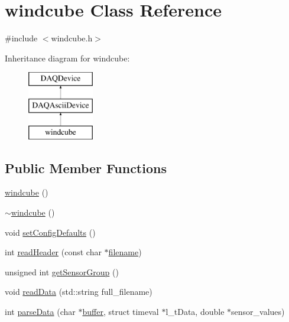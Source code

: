 \hypertarget{classwindcube}{\section{windcube Class Reference}
\label{classwindcube}
}


{\ttfamily \#include $<$windcube.\-h$>$}

Inheritance diagram for windcube\-:\begin{figure}[H]
\begin{center}
\leavevmode
\includegraphics[height=3.000000cm]{classwindcube}
\end{center}
\end{figure}
\subsection*{Public Member Functions}
\begin{DoxyCompactItemize}
\item 
\hyperlink{classwindcube_a8ae21721598a79437be9852ccaa266aa}{windcube} ()
\item 
\hyperlink{classwindcube_a08dd08e8a45cd9082be7bd488a8d230f}{$\sim$windcube} ()
\item 
void \hyperlink{classwindcube_ab15ca79d204a336abbd7ab5245ec9e55}{set\-Config\-Defaults} ()
\item 
int \hyperlink{classwindcube_a369ea13a1dcd471ad51250f89151364b}{read\-Header} (const char $\ast$\hyperlink{classDAQDevice_a7f9cda7cf5b41f6b134c313477e9644b}{filename})
\item 
unsigned int \hyperlink{classwindcube_a705808162810f8f4430e2bc3ca04a181}{get\-Sensor\-Group} ()
\item 
void \hyperlink{classwindcube_ab0a74d15ddda343b34ff4b28389fa811}{read\-Data} (std\-::string full\-\_\-filename)
\item 
int \hyperlink{classwindcube_a72691b4435de39d059542a1ccd064683}{parse\-Data} (char $\ast$\hyperlink{classDAQDevice_ab661aa5c5b4bafe78354f5169b1c7d2f}{buffer}, struct timeval $\ast$l\-\_\-t\-Data, double $\ast$sensor\-\_\-values)
\end{DoxyCompactItemize}

